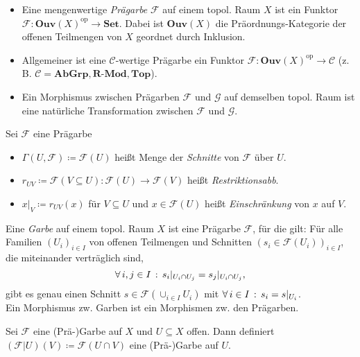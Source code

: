 \documentclass{cheat-sheet}
\newcommand{\SetC}{\mathbf{Set}} %
\newcommand{\Top}{\mathbf{Top}} %
\newcommand{\AbGrp}{\mathbf{AbGrp}} %
\newcommand{\RMod}{\mathbf{R\text{-}Mod}} %
\newcommand{\Ouv}{\mathbf{Ouv}} %
\newcommand{\op}{\mathrm{op}} %
\newcommand{\Fais}{\mathcal{F}} %
\newcommand{\Garb}{\mathcal{G}} %
\begin{document}
\begin{defn}
  \begin{itemize}
    \item Eine mengenwertige \emph{Prägarbe} $\Fais$ auf einem topol. Raum $X$ ist ein Funktor
    $\Fais : \Ouv(X)^\op \to \SetC$.
    Dabei ist $\Ouv(X)$ die Präordnungs-Kategorie der offenen Teilmengen von $X$ geordnet durch Inklusion.
    \item Allgemeiner ist eine $\mathcal{C}$-wertige Prägarbe ein Funktor $\Fais : \Ouv(X)^\op \to \mathcal{C}$ (z.\,B. $\mathcal{C} = \AbGrp, \RMod, \Top$).
    \item Ein Morphismus zwischen Prägarben $\Fais$ und $\Garb$ auf demselben topol. Raum ist eine natürliche Transformation zwischen $\Fais$ und $\Garb$.
  \end{itemize}
\end{defn}

\begin{nota}
  Sei $\Fais$ eine Prägarbe
  \begin{itemize}
    \item $\Gamma(U, \Fais) \coloneqq \Fais(U)$ heißt Menge der \emph{Schnitte} von $\Fais$ über $U$.
    \item $r_{UV} \coloneqq \Fais(V \subseteq U) : \Fais(U) \to \Fais(V)$ heißt \emph{Restriktionsabb}.
    \item $x|_V \coloneqq r_{UV}(x)$ für $V \subseteq U$ und $x \in \Fais(U)$ heißt \emph{Einschränkung} von $x$ auf $V$.
  \end{itemize}
\end{nota}

\begin{defn}
  Eine \emph{Garbe} auf einem topol. Raum $X$ ist eine Prägarbe $\Fais$, für die gilt:
  Für alle Familien $(U_i)_{i \in I}$ von offenen Teilmengen und Schnitten $(s_i \in \Fais(U_i))_{i \in I}$, die miteinander verträglich sind, \dh{}
  \[ \forall \, {i, j \in I} \,:\, s_i|_{U_i \cap U_j} = s_j|_{U_i \cap U_j}, \]
  gibt es genau einen Schnitt $s \in \Fais(\cup_{i \in I} U_i)$ mit $\forall \, {i \in I} \,:\, s_i = s|_{U_i}$.\\
  Ein Morphismus zw. Garben ist ein Morphismen zw. den Prägarben.
\end{defn}

\begin{bem}
  Sei $\Fais$ eine (Prä-)Garbe auf $X$ und $U \subseteq X$ offen. Dann definiert $(\Fais|U)(V) \coloneqq \Fais(U \cap V)$ eine (Prä-)Garbe auf $U$.
\end{bem}
\end{document}

